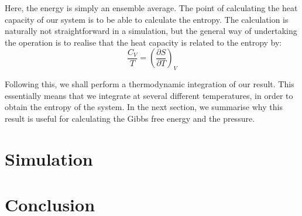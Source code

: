 \documentclass[12pt,a4paper]{report}
\begin{document}
Here, the energy is simply an ensemble average. The point of calculating the heat capacity of our system is to be able to calculate the entropy. The calculation is naturally not straightforward in a simulation, but the general way of undertaking the operation is to realise that the heat capacity is related to the entropy by:
\begin{equation}
\frac{C_V}{T} = \left( \frac{\partial S}{\partial T}\right)_V
\end{equation}

Following this, we shall perform a thermodynamic integration of our result. This essentially means that we integrate at several different temperatures, in order to obtain the entropy of the system. In the next section, we summarise why this result is useful for calculating the Gibbs free energy and the pressure.




\chapter{Simulation}


\chapter{Conclusion}
\end{document}
